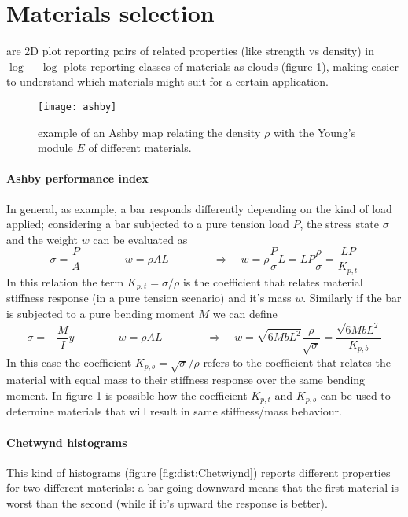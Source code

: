 	
\section{Materials selection}
	
	 are 2D plot reporting pairs of related properties (like strength vs density) in $\log-\log$ plots reporting classes of materials as clouds (figure \ref{fig:dist:ashby}), making easier to understand which materials might suit for a certain application.
	
	\begin{figure}[bht]
		\centering \texttt{[image: ashby]}
		\caption{example of an Ashby map relating the density $\rho$ with the Young's module $E$ of different materials.} \label{fig:dist:ashby}
	\end{figure}
	
	\paragraph{Ashby performance index} In general, as example, a bar responds differently depending on the kind of load applied; considering a bar subjected to a pure tension load $P$, the stress state $\sigma$ and the weight $w$ can be evaluated as
	\[ \sigma = \frac P A \qquad \qquad w = \rho A L  \qquad \qquad \Rightarrow \quad w = \rho \frac P \sigma L = LP \frac \rho\sigma = \frac{LP}{K_{p,t}} \]
	In this relation the term $K_{p,t} = \sigma/\rho$ is the coefficient that relates material stiffness response (in a pure tension scenario) and it's mass $w$. Similarly if the bar is subjected to a pure bending moment $M$ we can define	
	\[ \sigma = -\frac {M}{I}y \qquad \qquad w = \rho A L  \qquad \qquad \Rightarrow \quad w = \sqrt{6MbL^2} \frac{\rho}{\sqrt{\sigma}} =  \frac{ \sqrt{6MbL^2}}{K_{p,b}}  \]
	In this case the coefficient $K_{p,b} = \sqrt \sigma/\rho$ refers to the coefficient that relates the material with equal mass to their stiffness response over the same bending moment. In figure \ref{fig:dist:ashby} is possible how the coefficient $K_{p,t}$ and $K_{p,b}$ can be used to determine materials that will result in same stiffness/mass behaviour.
	
	\paragraph{Chetwynd histograms} This kind of histograms (figure \ref{fig:dist:Chetwiynd}) reports different properties for two different materials: a bar going downward means that the first material is worst than the second (while if it's upward the response is better).
	
